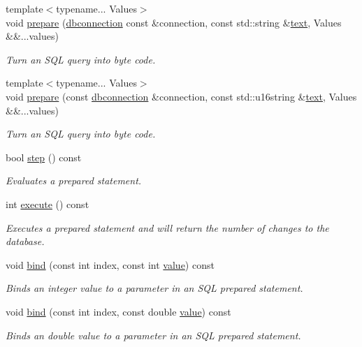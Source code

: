 \begin{DoxyCompactItemize}
{\footnotesize template$<$typename... Values$>$ }\\void \hyperlink{a00013_a6825366938fd914456b63c7e63ddc6f0}{prepare} (\hyperlink{a00004}{dbconnection} const \&connection, const std\-::string \&\hyperlink{a00038_a7467e5cdd32bbf7fce35aced88682dc0a1cb251ec0d568de6a929b520c4aed8d1}{text}, Values \&\&...values)
\begin{DoxyCompactList}\small\item\em Turn an S\-Q\-L query into byte code. \end{DoxyCompactList}\item 
{\footnotesize template$<$typename... Values$>$ }\\void \hyperlink{a00013_abb6b5ec78b6ed682f11667f5a611818c}{prepare} (const \hyperlink{a00004}{dbconnection} \&connection, const std\-::u16string \&\hyperlink{a00038_a7467e5cdd32bbf7fce35aced88682dc0a1cb251ec0d568de6a929b520c4aed8d1}{text}, Values \&\&...values)
\begin{DoxyCompactList}\small\item\em Turn an S\-Q\-L query into byte code. \end{DoxyCompactList}\item 
bool \hyperlink{a00013_ad1039653cca9f00708ce570011791b9d}{step} () const 
\begin{DoxyCompactList}\small\item\em Evaluates a prepared statement. \end{DoxyCompactList}\item 
int \hyperlink{a00013_a7a01f06c30b4f751d65f0f14fae3277a}{execute} () const 
\begin{DoxyCompactList}\small\item\em Executes a prepared statement and will return the number of changes to the database. \end{DoxyCompactList}\item 
void \hyperlink{a00013_a91d16077f086fe6becb4c7bae576b0e7}{bind} (const int index, const int \hyperlink{a00015}{value}) const 
\begin{DoxyCompactList}\small\item\em Binds an integer value to a parameter in an S\-Q\-L prepared statement. \end{DoxyCompactList}\item 
void \hyperlink{a00013_a80f067e9b5bc981210593d3aac067cc5}{bind} (const int index, const double \hyperlink{a00015}{value}) const 
\begin{DoxyCompactList}\small\item\em Binds an double value to a parameter in an S\-Q\-L prepared statement. \end{DoxyCompactList}\item 

\end{DoxyCompactItemize}
